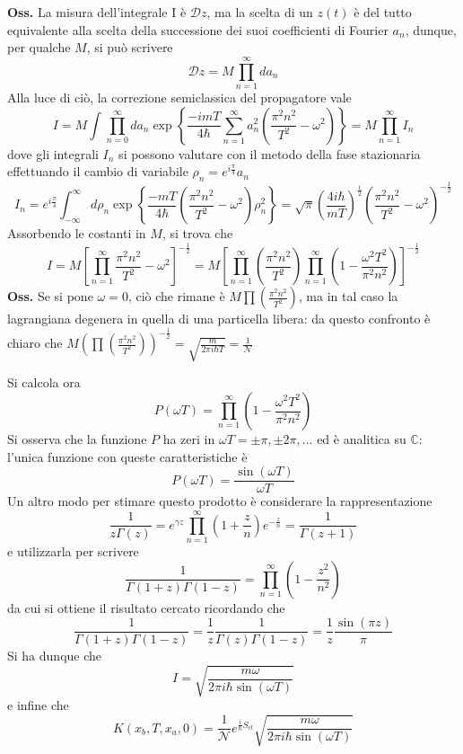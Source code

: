 \textbf{Oss.} La misura dell'integrale I è $\mathcal{D}z$, ma la scelta di un $z(t)$ è del tutto
equivalente alla scelta della successione dei suoi coefficienti di Fourier $a_n$, dunque, per qualche
$M$, si può scrivere
$$\mathcal{D}z = M\prod_{n=1}^{\infty}da_n$$
Alla luce di ciò, la correzione semiclassica del propagatore vale
$$I = M\int_{}^{}\prod_{n=0}^{\infty}da_n\exp
\left\{\frac{-imT}{4\hbar}\sum_{n=1}^{\infty}a_n^2\left(\frac{\pi^2n^2}{T^2}-\omega^2\right)\right\} = 
M\prod_{n=1}^{\infty}I_n$$	
dove gli integrali $I_n$ si possono valutare con il metodo della fase stazionaria effettuando il cambio
di variabile $\rho_n = e^{i\frac{\pi}{4}}a_n$
$$I_n = e^{i\frac{\pi}{4}}\int_{-\infty}^{\infty}d\rho_n \exp\left\{\frac{-mT}{4\hbar}
\left(\frac{\pi^2n^2}{T^2}-\omega^2\right)\rho_n^2\right\} =
\sqrt{\pi}\left(\frac{4i\hbar}{mT}\right)^{\frac{1}{2}}\left(\frac{\pi^2n^2}{T^2}-\omega^2\right)
^{-\frac{1}{2}}$$
Assorbendo le costanti in $M$, si trova che
$$I = M\left[\prod_{n=1}^{\infty}\frac{\pi^2n^2}{T^2}-\omega^2\right]^{-\frac{1}{2}} = 
M\left[\prod_{n=1}^{\infty}\left(\frac{\pi^2n^2}{T^2}\right)\prod_{n=1}^{\infty}\left(1-
\frac{\omega^2T^2}{\pi^2n^2}\right)\right]^{-\frac{1}{2}}$$
\textbf{Oss.} Se si pone $\omega=0$, ciò che rimane è $M\prod\left(\frac{\pi^2n^2}{T^2}\right)$, ma
in tal caso la lagrangiana degenera in quella di una particella libera: da questo confronto
è chiaro che $M\left(\prod_{}^{}\left(\frac{\pi^2n^2}{T^2}\right)\right)^{-\frac{1}{2}} = \sqrt{\frac{m}{2\pi i\hbar T}}=\frac{1}{\mathcal{N}}$

Si calcola ora
$$P(\omega T)=\prod_{n=1}^{\infty}\left(1-\frac{\omega^2T^2}{\pi^2n^2}\right)$$
Si osserva che la funzione $P$ ha zeri in
$\omega T=\pm\pi,\pm2\pi,...$ ed è analitica su $\mathbb{C}$: l'unica funzione con queste
caratteristiche è
$$P(\omega T) = \frac{\sin(\omega T)}{\omega T}$$
Un altro modo per stimare questo prodotto è considerare la rappresentazione
$$\frac{1}{z\Gamma(z)}=e^{\gamma z}\prod_{n=1}^{\infty}\left(1+\frac{z}{n}\right)e^{-\frac{z}{n}} = 
\frac{1}{\Gamma(z+1)}$$
e utilizzarla per scrivere
$$\frac{1}{\Gamma(1+z)\Gamma(1-z)} = \prod_{n=1}^{\infty}\left(1-\frac{z^2}{n^2}\right)$$
da cui si ottiene il risultato cercato ricordando che
$$\frac{1}{\Gamma(1+z)\Gamma(1-z)} =\frac{1}{z}\frac{1}{\Gamma(z)\Gamma(1-z)} = \frac{1}{z}
\frac{\sin(\pi z)}{\pi}$$
Si ha dunque che
$$I = \sqrt{\frac{m\omega}{2\pi i\hbar\sin(\omega T)}}$$
e infine che 
$$\boxed{K(x_b,T,x_a,0) =\frac{1}{\mathcal{N}}e^{\frac{i}{\hbar}S_{cl}}\sqrt{\frac{m\omega}{2\pi i\hbar\sin(\omega T)}}}$$
